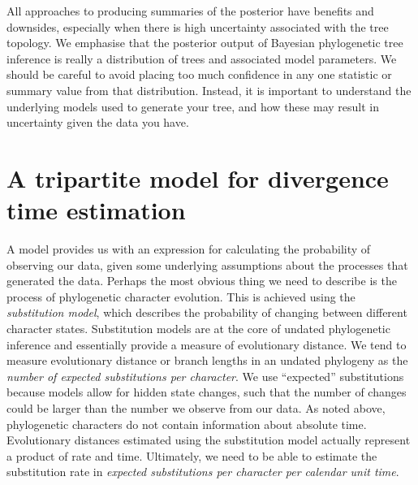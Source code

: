 All approaches to producing summaries of the posterior have benefits and downsides, especially when there is high uncertainty associated with the tree topology.
We emphasise that the posterior output of Bayesian phylogenetic tree inference is really a distribution of trees and associated model parameters. 
We should be careful to avoid placing too much confidence in any one statistic or summary value from that distribution.
Instead, it is important to understand the underlying models used to generate your tree, and how these may result in uncertainty given the data you have.

\section{A tripartite model for divergence time estimation}
 
A model provides us with an expression for calculating the probability of observing our data, given some underlying assumptions about the processes that generated the data. 
Perhaps the most obvious thing we need to describe is the process of phylogenetic character evolution.
This is achieved using the \textit{substitution model}, which describes the probability of changing between different character states.
Substitution models are at the core of undated phylogenetic inference and essentially provide a measure of evolutionary distance.
We tend to measure evolutionary distance or branch lengths in an undated phylogeny as the \textit{number of expected substitutions per character}. We use ``expected'' substitutions because models allow for hidden state changes, such that the number of changes could be larger than the number we observe from our data.
As noted above, phylogenetic characters do not contain information about absolute time. Evolutionary distances estimated using the substitution model actually represent a product of rate and time.
Ultimately, we need to be able to estimate the substitution rate in \textit{expected substitutions per character per calendar unit time}. %

